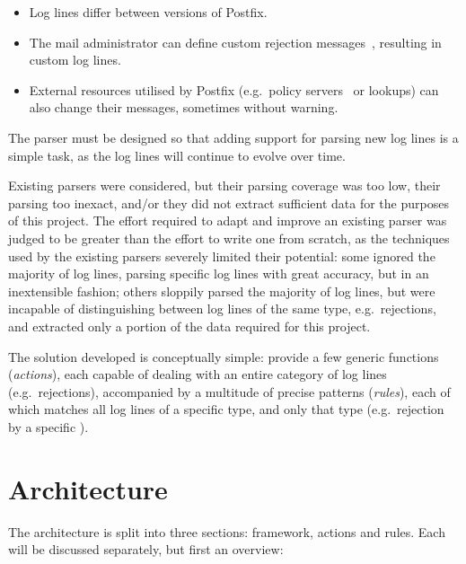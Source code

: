 \documentclass[draft]{svmult}
\begin{document}
\begin{itemize}

    \item Log lines differ between versions of Postfix.
        
    \item The mail administrator can define custom rejection
        messages~\cite{postfix-lookup-tables, smtpd_access_readme,
        smtpd_per_user_control}, resulting in custom log lines.

    \item External resources utilised by Postfix (e.g.\ policy
        servers~\cite{policy-servers} or \RBL{} lookups) can also change
        their messages, sometimes without warning.

\end{itemize}

The parser must be designed so that adding support for parsing new log
lines is a simple task, as the log lines will continue to evolve over time.

Existing parsers were considered, but their parsing coverage was too low,
their parsing too inexact, and/or they did not extract sufficient data for
the purposes of this project.  The effort required to adapt and improve an
existing parser was judged to be greater than the effort to write one from
scratch, as the techniques used by the existing parsers severely limited
their potential: some ignored the majority of log lines, parsing specific
log lines with great accuracy, but in an inextensible fashion; others
sloppily parsed the majority of log lines, but were incapable of
distinguishing between log lines of the same type, e.g.\ rejections, and
extracted only a portion of the data required for this project.

The solution developed is conceptually simple: provide a few generic
functions (\textit{actions\/}), each capable of dealing with an entire
category of log lines (e.g.\ rejections), accompanied by a multitude of
precise patterns (\textit{rules\/}), each of which matches all log lines of
a specific type, and only that type (e.g.\ rejection by a specific
\RBLshort{}).


\section{Architecture}

\label{Architecture}

The architecture is split into three sections: framework, actions and
rules.  Each will be discussed separately, but first an overview:
\end{document}
